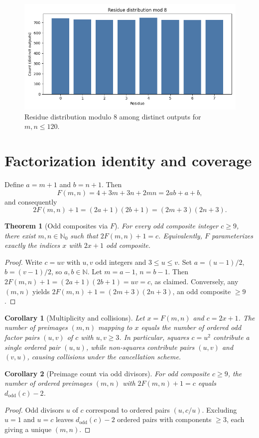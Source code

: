 \documentclass[12pt,a4paper]{article}
\newtheorem{theorem}{Theorem}[section]
\newtheorem{corollary}{Corollary}[section]
\begin{document}
\begin{figure}[h]
\centering
\includegraphics[width=0.7\linewidth]{../fig/residues_mod_8.png}
\caption{Residue distribution modulo 8 among distinct outputs for \(m,n\le 120\).}
\label{fig:mod8}
\end{figure}

\section{Factorization identity and coverage}
Define \(a=m+1\) and \(b=n+1\). Then
\[
F(m,n) = 4 + 3m + 3n + 2mn = 2ab + a + b,
\]
and consequently
\[
2F(m,n) + 1 = (2a+1)(2b+1) = (2m+3)(2n+3).
\]

\begin{theorem}[Odd composites via \(F\)]\label{thm:coverage}
For every odd composite integer \(c\ge 9\), there exist \(m,n\in\mathbb{N}_0\) such that \(2F(m,n) + 1 = c\). Equivalently, \(F\) parameterizes exactly the indices \(x\) with \(2x+1\) odd composite.
\end{theorem}
\begin{proof}
Write \(c=uv\) with \(u,v\) odd integers and \(3\le u\le v\). Set \(a=(u-1)/2\), \(b=(v-1)/2\), so \(a,b\in\mathbb{N}\). Let \(m=a-1\), \(n=b-1\). Then
\(2F(m,n) + 1 = (2a+1)(2b+1) = uv = c\), as claimed. Conversely, any \((m,n)\) yields \(2F(m,n)+1=(2m+3)(2n+3)\), an odd composite \(\ge 9\).
\end{proof}

\begin{corollary}[Multiplicity and collisions]\label{cor:mult}
Let \(x=F(m,n)\) and \(c=2x+1\). The number of preimages \((m,n)\) mapping to \(x\) equals the number of ordered odd factor pairs \((u,v)\) of \(c\) with \(u,v\ge 3\). In particular, squares \(c=u^2\) contribute a single ordered pair \((u,u)\), while non-squares contribute pairs \((u,v)\) and \((v,u)\), causing collisions under the cancellation scheme.
\end{corollary}

\begin{corollary}[Preimage count via odd divisors]\label{cor:odddiv}
For odd composite \(c\ge 9\), the number of ordered preimages \((m,n)\) with \(2F(m,n)+1=c\) equals \(d_{\mathrm{odd}}(c) - 2\).
\end{corollary}
\begin{proof}
Odd divisors \(u\) of \(c\) correspond to ordered pairs \((u, c/u)\). Excluding \(u=1\) and \(u=c\) leaves \(d_{\mathrm{odd}}(c)-2\) ordered pairs with components \(\ge 3\), each giving a unique \((m,n)\).
\end{proof}
\end{document}
